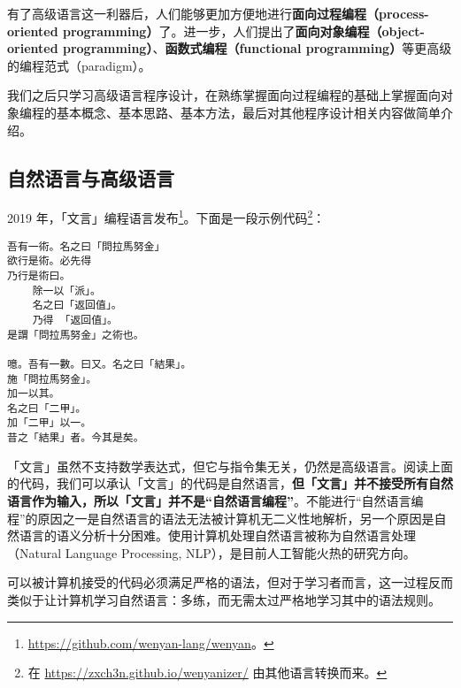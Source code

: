 有了高级语言这一利器后，人们能够更加方便地进行\textbf{面向过程编程（process-oriented programming）}了。进一步，人们提出了\textbf{面向对象编程（object-oriented programming）}、\textbf{函数式编程（functional programming）}等更高级的编程范式（paradigm）。

我们之后只学习高级语言程序设计，在熟练掌握面向过程编程的基础上掌握面向对象编程的基本概念、基本思路、基本方法，最后对其他程序设计相关内容做简单介绍。

\subsection{自然语言与高级语言}

2019 年，「文言」编程语言发布\footnote{\url{https://github.com/wenyan-lang/wenyan}。}。下面是一段示例代码\footnote{在 \url{https://zxch3n.github.io/wenyanizer/} 由其他语言转换而来。}：

\begin{lstlisting}[language={}, numbers=none]
吾有一術。名之曰「問拉馬努金」
欲行是術。必先得
乃行是術曰。
	除一以「派」。
	名之曰「返回值」。
	乃得 「返回值」。
是謂「問拉馬努金」之術也。

噫。吾有一數。曰又。名之曰「結果」。
施「問拉馬努金」。
加一以其。
名之曰「二甲」。
加「二甲」以一。
昔之「結果」者。今其是矣。
\end{lstlisting}

「文言」虽然不支持数学表达式，但它与指令集无关，仍然是高级语言。阅读上面的代码，我们可以承认「文言」的代码是自然语言，\textbf{但「文言」并不接受所有自然语言作为输入，所以「文言」并不是“自然语言编程”}。不能进行“自然语言编程”的原因之一是自然语言的语法无法被计算机无二义性地解析，另一个原因是自然语言的语义分析十分困难。使用计算机处理自然语言被称为自然语言处理（Natural Language Processing, NLP），是目前人工智能火热的研究方向。

可以被计算机接受的代码必须满足严格的语法，但对于学习者而言，这一过程反而类似于让计算机学习自然语言：多练，而无需太过严格地学习其中的语法规则。

\pagebreak